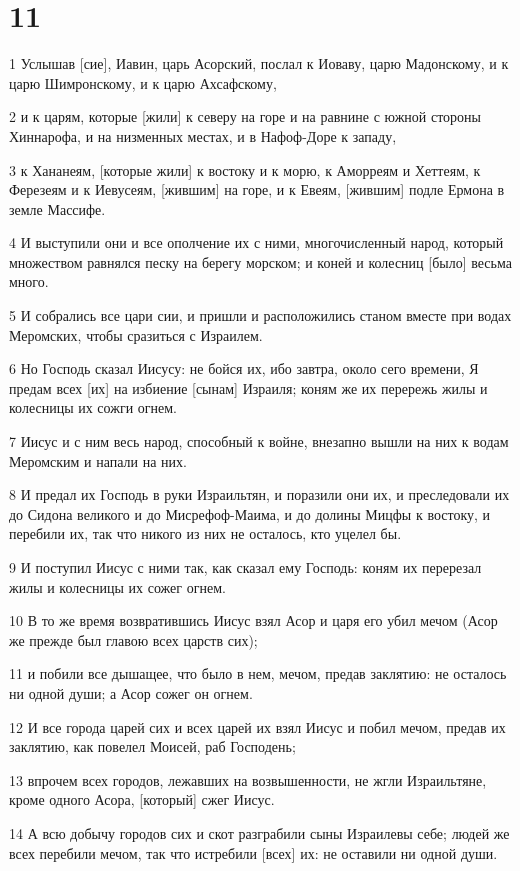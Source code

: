 \chapter{11}

\par 1 Услышав [сие], Иавин, царь Асорский, послал к Иоваву, царю Мадонскому, и к царю Шимронскому, и к царю Ахсафскому,
\par 2 и к царям, которые [жили] к северу на горе и на равнине с южной стороны Хиннарофа, и на низменных местах, и в Нафоф-Доре к западу,
\par 3 к Хананеям, [которые жили] к востоку и к морю, к Аморреям и Хеттеям, к Ферезеям и к Иевусеям, [жившим] на горе, и к Евеям, [жившим] подле Ермона в земле Массифе.
\par 4 И выступили они и все ополчение их с ними, многочисленный народ, который множеством равнялся песку на берегу морском; и коней и колесниц [было] весьма много.
\par 5 И собрались все цари сии, и пришли и расположились станом вместе при водах Меромских, чтобы сразиться с Израилем.
\par 6 Но Господь сказал Иисусу: не бойся их, ибо завтра, около сего времени, Я предам всех [их] на избиение [сынам] Израиля; коням же их перережь жилы и колесницы их сожги огнем.
\par 7 Иисус и с ним весь народ, способный к войне, внезапно вышли на них к водам Меромским и напали на них.
\par 8 И предал их Господь в руки Израильтян, и поразили они их, и преследовали их до Сидона великого и до Мисрефоф-Маима, и до долины Мицфы к востоку, и перебили их, так что никого из них не осталось, кто уцелел бы.
\par 9 И поступил Иисус с ними так, как сказал ему Господь: коням их перерезал жилы и колесницы их сожег огнем.
\par 10 В то же время возвратившись Иисус взял Асор и царя его убил мечом (Асор же прежде был главою всех царств сих);
\par 11 и побили все дышащее, что было в нем, мечом, предав заклятию: не осталось ни одной души; а Асор сожег он огнем.
\par 12 И все города царей сих и всех царей их взял Иисус и побил мечом, предав их заклятию, как повелел Моисей, раб Господень;
\par 13 впрочем всех городов, лежавших на возвышенности, не жгли Израильтяне, кроме одного Асора, [который] сжег Иисус.
\par 14 А всю добычу городов сих и скот разграбили сыны Израилевы себе; людей же всех перебили мечом, так что истребили [всех] их: не оставили ни одной души.
